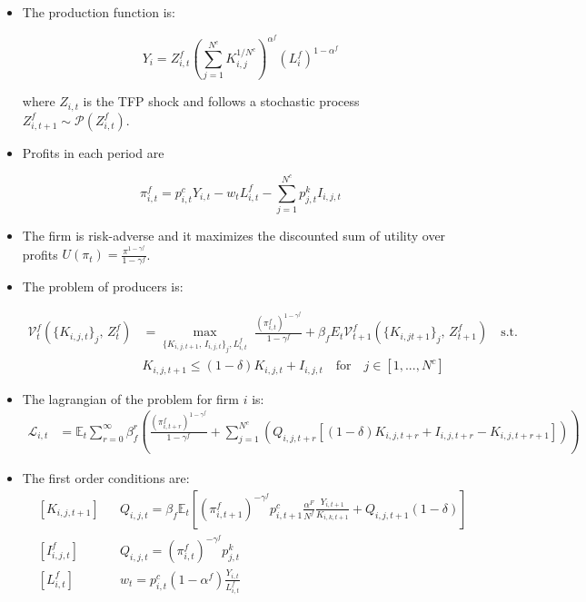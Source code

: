 \documentclass[11pt]{article}
\newcommand{\E}{\mathbb{E}}
\numberwithin{equation}{section}
\begin{document}
\begin{itemize}
	
\item The production function is:

 $$Y_i = Z^f_{i,t} \left( \sum_{j=1}^{N^c } K^{1/N^c}_{i,j}\right)^{\alpha^f} \left(L_i^f\right)^{1-\alpha^f}$$
 
 where $Z_{i,t}$ is the TFP shock and follows a stochastic process $Z^f_{i,t+1} \sim \mathcal{P}(Z^f_{i,t})$. 
	
\item Profits in each period are

$$\pi^f_{i,t}=p^c_{i,t} Y_{i,t}-w_{t}  L^f_{i,t}-\sum_{j=1}^{N^c} p^k_{j,t} I_{i,j,t}$$

\item The firm is risk-adverse and it maximizes the discounted sum of utility over profits $U(\pi_t) = \frac{\pi^{1-\gamma^f}}{1-\gamma^f}$.

\item The problem of producers is:

\begin{align*}
\mathcal{V}_{t}^{f}\left(\{K_{i,j,t}\}_j,\,Z_t^f\right)&=\max_{\{K_{i,j,t+1},\, I_{i,j,t}\}_j,  L^f_{i,t}}\,\,
\frac{\left(\pi_{i,t}^f\right)^{1-\gamma^f}}{1-\gamma^f}+\beta_f E_{t}\mathcal{V}^f_{t+1}(\{K_{i,jt+1}\}_j,\,Z_{t+1}^f)\quad\text{{s.t.}}\\
&K_{i,j,t+1} \leq(1-\delta)K_{i,j,t}+I_{i,j,t} \quad \text{for} \quad j \in [1,...,N^c]
\end{align*}

\item The lagrangian of the problem for firm $i$ is:
\begin{align*}
\mathcal{L}_{i,t} &= \E_t \sum_{r=0}^{\infty}\beta^r_f \left(\frac{\left(\pi_{i,t+r}^f\right)^{1-\gamma^f}}{1-\gamma^f} +
\sum_{j=1}^{N^c} \left(Q_{i,j,t+r} [(1-\delta)K_{i,j,t+r}+I_{i,j,t+r} -K_{i,j,t+r+1}]\right) \right)
\end{align*}

\item The first order conditions are:
\begin{align}
& \left[K_{i,j,t+1}\right]
&&
Q_{i,j,t} =\beta_f \E_t \left[\left(\pi_{i,t+1}^f\right)^{-\gamma^f} p^c_{i,t+1} \frac{\alpha^F}{N^f} \frac{Y_{i,t+1}}{K_{i,k,t+1}} +Q_{i,j,t+1} (1-\delta) \right]
\\
& \left[ I^f_{i,j,t} \right]
&&
Q_{i,j,t} = \left(\pi_{i,t}^f\right)^{-\gamma^f} p^k_{j,t}
\\
& \left[ L^f_{i,t}\right]
&&
w_t = p^c_{i,t} (1-\alpha^f) \frac{Y_{i,t}}{ L^f_{i,t}}
\end{align}




\end{itemize}
\end{document}
